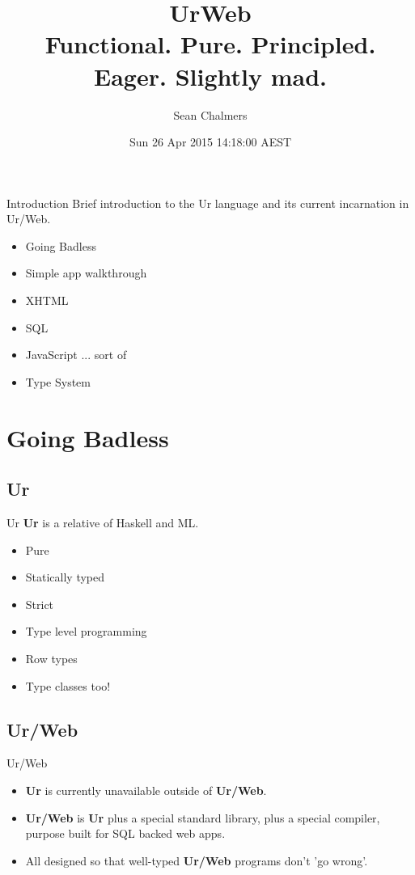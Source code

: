 \documentclass{beamer}
\title[Introduction to UrWeb]{UrWeb\\Functional. Pure. Principled. Eager. Slightly mad.}
\author{Sean Chalmers}
\date{Sun 26 Apr 2015 14:18:00 AEST}
\begin{document}
\begin{frame}
\titlepage
\end{frame}


\begin{frame}{Introduction}
Brief introduction to the Ur language and its current incarnation in Ur/Web.

\begin{itemize}
\item Going Badless
\item Simple app walkthrough
\item XHTML
\item SQL
\item JavaScript ... sort of
\item Type System
\end{itemize}
\end{frame}

\section{Going Badless}
\subsection{Ur}

\begin{frame}{Ur}
\textbf{Ur} is a relative of Haskell and ML.

\begin{itemize}
\item Pure
\item Statically typed
\item Strict
\item Type level programming
\item Row types
\item Type classes too!
\end{itemize}
\end{frame}

\subsection{Ur/Web}
\begin{frame}{Ur/Web}

\begin{itemize}
\item \textbf{Ur} is currently unavailable outside of \textbf{Ur/Web}.
\item \textbf{Ur/Web} is \textbf{Ur} plus a special standard library,
 plus a special compiler, purpose built for SQL backed web apps.
\item All designed so that well-typed \textbf{Ur/Web} programs don't 'go wrong'.
\end{itemize}
\end{frame}
\end{document}
